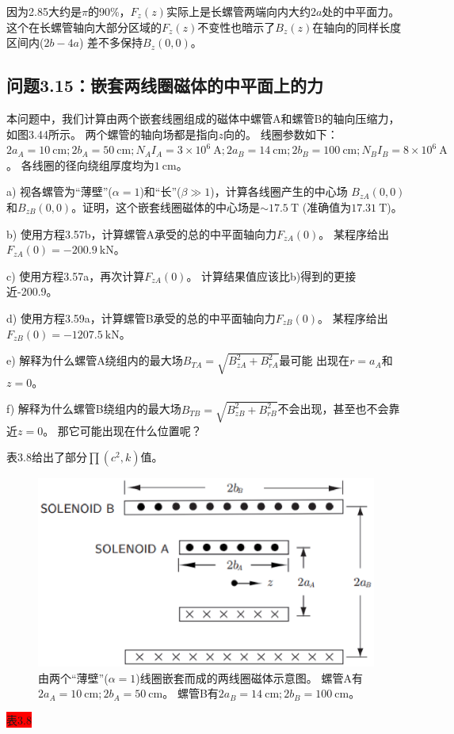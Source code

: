 因为2.85大约是$\pi$的90\%，$F_z(z)$实际上是长螺管两端向内大约$2a$处的中平面力。
这个在长螺管轴向大部分区域的$F_z(z)$不变性也暗示了$B_z(z)$在轴向的同样长度区间内($2b-4a$)
差不多保持$B_z(0,0)$。
\newpage



\subsection{问题3.15：嵌套两线圈磁体的中平面上的力}
本问题中，我们计算由两个嵌套线圈组成的磁体中螺管A和螺管B的轴向压缩力，如图3.44所示。
两个螺管的轴向场都是指向$z$向的。
线圈参数如下：$2a_A=10\ \mathrm{cm};2b_A = 50\ \mathrm{cm}; N_A I_A = 3\times 10^6\ \mathrm{A};
2a_B = 14\ \mathrm{cm}; 2b_B = 100\ \mathrm{cm}; N_B I_B = 8\times10^6\ \mathrm{A}$。
各线圈的径向绕组厚度均为$1\ \mathrm{cm}$。

a) 视各螺管为“薄壁”($\alpha = 1$)和“长”($\beta\gg 1$)，计算各线圈产生的中心场
$B_{zA}(0, 0)$和$B_{zB}(0, 0)$。证明，这个嵌套线圈磁体的中心场是$\sim 17.5\ \mathrm{T}$
(准确值为$17.31\ \mathrm{T}$)。

b) 使用方程3.57b，计算螺管A承受的总的中平面轴向力$F_{zA}(0)$。
某程序给出$F_{zA}(0)=-200.9\ \mathrm{kN}$。

c) 使用方程3.57a，再次计算$F_{zA}(0)$。
计算结果值应该比b)得到的更接近-200.9。

d) 使用方程3.59a，计算螺管B承受的总的中平面轴向力$F_{zB}(0)$。
某程序给出$F_{zB}(0)=-1207.5\ \mathrm{kN}$。

e) 解释为什么螺管A绕组内的最大场$B_{TA}=\sqrt{B_{zA}^2 + B_{rA}^2}$最可能
	出现在$r=a_A$和$z=0$。
	
f) 解释为什么螺管B绕组内的最大场$B_{TB}=\sqrt{B_{zB}^2 + B_{rB}^2}$不会出现，甚至也不会靠近$z=0$。
那它可能出现在什么位置呢？

表3.8给出了部分$\prod(c^2,k)$值。

\begin{figure}[htbp]
	\centering
	\includegraphics[scale=0.5]{chpt3/figs/fig3.44.eps}
	\caption{由两个“薄壁”($\alpha = 1$)线圈嵌套而成的两线圈磁体示意图。
		螺管A有$2a_A=10\ \mathrm{cm};2b_A = 50\ \mathrm{cm}$。
		螺管B有$2a_B = 14\ \mathrm{cm}; 2b_B = 100\ \mathrm{cm}$。}
\end{figure}
\colorbox{red}{表3.8}


